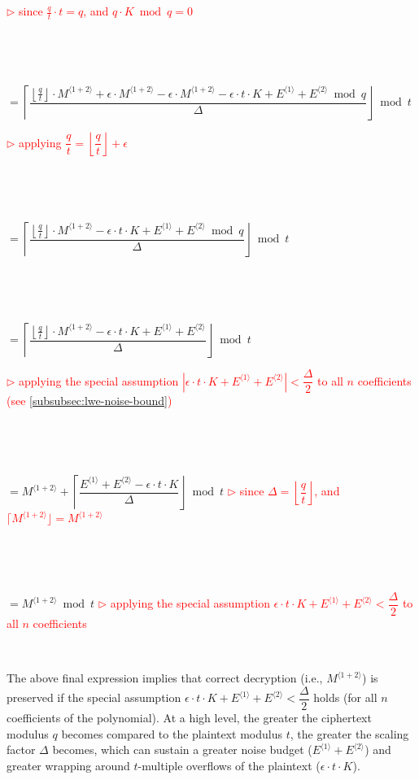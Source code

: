 \textcolor{red}{ $\rhd$ since $\frac{q}{t}\cdot t = q$, and $q\cdot K \bmod q = 0$}

$ $

$ $


$ = \left\lceil\dfrac{\left\lfloor\frac{q}{t}\right\rfloor \cdot M^{\langle 1 + 2\rangle} + \epsilon \cdot M^{\langle 1 + 2\rangle} - \epsilon \cdot M^{\langle 1 + 2\rangle}  - \epsilon \cdot t\cdot K + E^{\langle 1 \rangle} + E^{\langle 2 \rangle} \bmod q}{\Delta}\right\rfloor \bmod t$  

\textcolor{red}{ $\rhd$ applying  $\dfrac{q}{t} = \left\lfloor\dfrac{q}{t}\right\rfloor + \epsilon$}

$ $

$ $


$ = \left\lceil\dfrac{\left\lfloor\frac{q}{t}\right\rfloor \cdot M^{\langle 1 + 2\rangle} - \epsilon \cdot t\cdot K + E^{\langle 1 \rangle} + E^{\langle 2 \rangle} \bmod q}{\Delta}\right\rfloor \bmod t$  

$ $

$ $

$ = \left\lceil\dfrac{\left\lfloor\frac{q}{t}\right\rfloor \cdot M^{\langle 1 + 2\rangle} - \epsilon \cdot t\cdot K + E^{\langle 1 \rangle} + E^{\langle 2 \rangle}}{\Delta}\right\rfloor \bmod t$  

\textcolor{red}{ $\rhd$ applying the special assumption $|\epsilon \cdot t \cdot K + E^{\langle 1 \rangle} + E^{\langle 2 \rangle}| < \dfrac{\Delta}{2}$ to all $n$ coefficients (see \autoref{subsubsec:lwe-noise-bound})}

$ $

$ $


$ = M^{\langle 1 + 2\rangle} + \left\lceil\dfrac{E^{\langle 1 \rangle} + E^{\langle 2 \rangle} - \epsilon \cdot t\cdot K}{\Delta}\right\rfloor \bmod t$  \textcolor{red}{ $\rhd$ since  $\Delta = \left\lfloor\dfrac{q}{t}\right\rfloor$, and $\lceil M^{\langle 1 + 2\rangle} \rfloor = M^{\langle 1 + 2\rangle}$}

$ $

$ $

$ = M^{\langle 1 + 2\rangle} \bmod t$
\textcolor{red}{ $\rhd$ applying the special assumption $\epsilon \cdot t \cdot K + E^{\langle 1 \rangle} + E^{\langle 2 \rangle} < \dfrac{\Delta}{2}$ to all $n$ coefficients}


$ $

The above final expression implies that correct decryption (i.e., $M^{\langle 1 + 2\rangle}$) is preserved if 
the special assumption $\epsilon \cdot t \cdot K + E^{\langle 1 \rangle} + E^{\langle 2 \rangle} < \dfrac{\Delta}{2}$ holds (for all $n$ coefficients of the polynomial). At a high level, the greater the ciphertext modulus $q$ becomes compared to the plaintext modulus $t$, the greater the scaling factor $\Delta$ becomes, which can sustain a greater noise budget ($E^{\langle 1 \rangle} + E^{\langle 2 \rangle}$) and greater wrapping around $t$-multiple overflows of the plaintext ($\epsilon \cdot t\cdot K$). 

